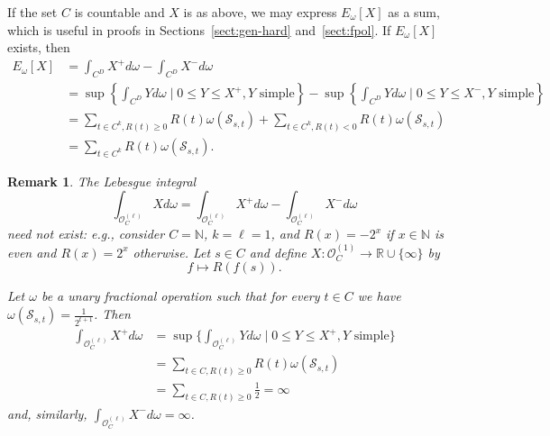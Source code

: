 \documentclass[nonacm]{acmart}
\newtheorem{remark}[theorem]{Remark}
\begin{document}
If the set $C$ is countable and $X$ is as above, we may express $E_{\omega}[X]$ as a sum, which is useful in proofs in Sections~\ref{sect:gen-hard} and~\ref{sect:fpol}.
If $E_{\omega}[X]$ exists,
then
\begin{align}
E_{\omega}[X] & = \int_{C^D} X^+ d \omega - \int_{C^D} X^- d \omega \nonumber \\
& = \sup \left \{ \int_{C^D} Y d \omega \mid 0 \leq Y \leq X^+, Y \text{ simple} \right \} - \sup \left \{ \int_{C^D} Y d \omega \mid 0 \leq Y \leq X^-, Y \text{ simple} \right \} \nonumber\\
& = \sum_{t \in C^k,R(t) \geq 0} R(t) \omega(
{\mathscr S}_{s,t})   
+ \sum_{t \in C^k,R(t) < 0} R(t) \omega(
{\mathscr S}_{s,t}) \nonumber \\
& = \sum_{t \in C^k} R(t) \omega(
{\mathscr S}_{s,t}).
\label{eq:exp-sum}
\end{align}

\begin{remark}\label{rem:undef}
The Lebesgue integral 
$$\int_{{\mathscr O}^{(\ell)}_C} X d \omega = \int_{{\mathscr O}^{(\ell)}_C} X^+ d \omega - \int_{{\mathscr O}^{(\ell)}_C} X^- d \omega $$
need not exist: 
e.g., consider $C = {\mathbb N}$, $k = \ell = 1$, and $R(x) = -2^x$ if $x \in {\mathbb N}$ is even and $R(x) = 2^x$ otherwise. Let $s \in C$ and define 
$X \colon {\mathscr O}^{(1)}_C \to {\mathbb R} \cup \{\infty\}$ by 
$$ f \mapsto R(f(s)).$$

Let $\omega$ be a unary fractional operation such that for every $t \in C$
we have 
$\omega({\mathscr S}_{s,t}) = \frac{1}{2^{t+1}}$. Then 
\begin{align*}
\int_{{\mathscr O}^{(\ell)}_C} X^+ d \omega & = \sup \{ \int_{{\mathscr O}^{(\ell)}_C} Y d \omega \mid 0 \leq Y \leq X^+, Y \text{ simple} \} \\
& = \sum_{t \in C,R(t) \geq 0} R(t) \omega(
{\mathscr S}_{s,t}) \\
& = \sum_{t \in C, R(t) \geq 0} \frac{1}{2} = \infty
\end{align*}
and, similarly, $\int_{{\mathscr O}^{(\ell)}_C} X^- d \omega
= \infty$. 
\end{remark}
\end{document}
